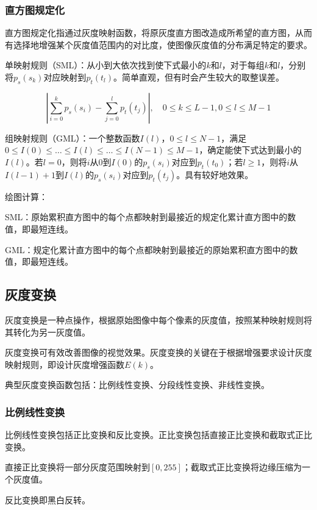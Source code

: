 \documentclass[cn, blue, normal, 12pt]{elegantnote}
\begin{document}
{\subsubsection{直方图规定化}

直方图规定化指通过灰度映射函数，将原灰度直方图改造成所希望的直方图，从而有选择地增强某个灰度值范围内的对比度，使图像灰度值的分布满足特定的要求。

单映射规则（SML）：从小到大依次找到使下式最小的$k$和$l$，对于每组$k$和$l$，分别将$p_s(s_k)$对应映射到$p_t(t_l)$。简单直观，但有时会产生较大的取整误差。

\begin{equation}
    \left|\sum_{i=0}^{k}p_s(s_i)-\sum_{j=0}^{l}p_t(t_j)\right|, \quad 0\leq k \leq L-1, 0\leq l \leq M-1
\end{equation}

组映射规则（GML）：一个整数函数$I(l)$，$0\leq l\leq N-1$，满足$0\leq I(0)\leq …\leq I(l)\leq …\leq I(N-1)\leq M-1$，确定能使下式达到最小的$I(l)$。若$l=0$，则将$i$从$0$到$I(0)$的$p_s(s_i)$对应到$p_t(t_0)$；若$l\geq 1$，则将$i$从$I(l-1)+1$到$I(l)$的$p_s(s_i)$对应到$p_t(t_j)$。具有较好地效果。

绘图计算：

SML：原始累积直方图中的每个点都映射到最接近的规定化累计直方图中的数值，即最短连线。

GML：规定化累计直方图中的每个点都映射到最接近的原始累积直方图中的数值，即最短连线。

\subsection{灰度变换}

灰度变换是一种点操作，根据原始图像中每个像素的灰度值，按照某种映射规则将其转化为另一灰度值。

灰度变换可有效改善图像的视觉效果。灰度变换的关键在于根据增强要求设计灰度映射规则，即设计灰度增强函数$E(k)$。

典型灰度变换函数包括：比例线性变换、分段线性变换、非线性变换。

\subsubsection{比例线性变换}

比例线性变换包括正比变换和反比变换。正比变换包括直接正比变换和截取式正比变换。

直接正比变换将一部分灰度范围映射到$[0,255]$；截取式正比变换将边缘压缩为一个灰度值。

反比变换即黑白反转。

}
\end{document}
